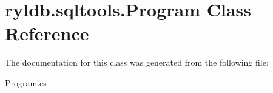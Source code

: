 \hypertarget{classryldb_1_1sqltools_1_1_program}{}\section{ryldb.\+sqltools.\+Program Class Reference}
\label{classryldb_1_1sqltools_1_1_program}


The documentation for this class was generated from the following file\+:\begin{DoxyCompactItemize}
\item 
Program.\+cs\end{DoxyCompactItemize}
